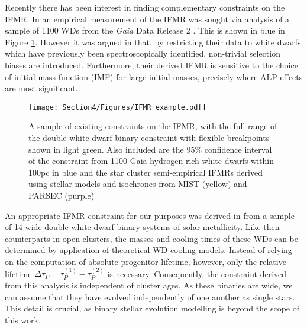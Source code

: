 Recently there has been interest in finding complementary constraints on the IFMR. In \cite{El-Badry} an empirical measurement of the IFMR was sought via analysis of a sample of 1100 WDs from the \textit{Gaia} Data Release 2 \cite{Gaia1, Gaia2}. This is shown in blue in Figure \ref{fig: IFMR Example}. However it was argued in \cite{Cummings_2018} that, by restricting their data to white dwarfs which have previously been spectroscopically identified, non-trivial selection biases are introduced. Furthermore, their derived IFMR is sensitive to the choice of initial-mass function (IMF) for large initial masses, precisely where ALP effects are most significant.


\begin{figure}[t]
    \centering
    \captionsetup{width=0.9\textwidth}
    \texttt{[image: Section4/Figures/IFMR\_example.pdf]}
    \caption{A sample of existing constraints on the IFMR, with the full range of the double white dwarf binary constraint with flexible breakpoints \cite{Andrews} shown in light green. Also included are the 95\% confidence interval of the constraint from 1100 Gaia hydrogen-rich white dwarfs within 100pc \cite{El-Badry} in blue and the star cluster semi-empirical IFMRs derived using stellar models and isochrones from MIST (yellow) and PARSEC (purple) \cite{Cummings_2018}}
    \label{fig: IFMR Example}
\end{figure}


An appropriate IFMR constraint for our purposes was derived in \cite{Andrews} from a sample of 14 wide double white dwarf binary systems of solar metallicity. Like their counterparts in open clusters, the masses and cooling times of these WDs can be determined by application of theoretical WD cooling models. Instead of relying on the computation of absolute progenitor lifetime, however, only the relative lifetime $\Delta\tau_P=\tau_{P}^{(1)}-\tau_{P}^{(2)}$ is necessary. Consequently, the constraint derived from this analysis is independent of cluster ages. As these binaries are wide, we can assume that they have evolved independently of one another as single stars. This detail is crucial, as binary stellar evolution modelling is beyond the scope of this work.



